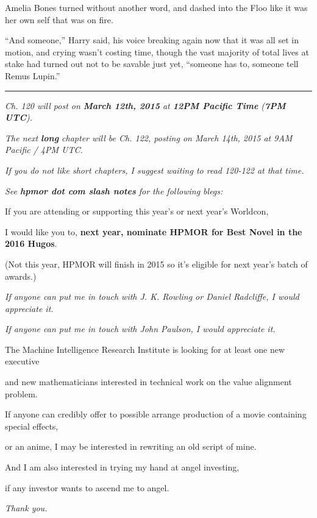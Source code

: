 Amelia Bones turned without another word, and dashed into the Floo like it was her own self that was on fire.

``And someone,'' Harry said, his voice breaking again now that it was all set in motion, and crying wasn't costing time, though the vast majority of total lives at stake had turned out not to be savable just yet, ``someone has to, someone tell Remus Lupin.''

\begin{center}\rule{3in}{0.4pt}\end{center}

\emph{Ch. 120 will post on \textbf{March 12th, 2015} at \textbf{12PM Pacific Time} (\textbf{7PM UTC}).}

\emph{The next \textbf{long} chapter will be Ch. 122, posting on March 14th, 2015 at 9AM Pacific / 4PM UTC.}

\emph{If you do not like short chapters, I suggest waiting to read 120-122 at that time.}

\emph{See \textbf{hpmor dot com slash notes} for the following blegs:}

If you are attending or supporting this year's or next year's Worldcon,

I would like you to, \textbf{next year, nominate HPMOR for Best Novel in the 2016 Hugos}.

(Not this year, HPMOR will finish in 2015 so it's eligible for next year's batch of awards.)

\emph{If anyone can put me in touch with J. K. Rowling or Daniel Radcliffe, I would appreciate it.}

\emph{If anyone can put me in touch with John Paulson, I would appreciate it.}

The Machine Intelligence Research Institute is looking for at least one new executive

and new mathematicians interested in technical work on the value alignment problem.

If anyone can credibly offer to possible arrange production of a movie containing special effects,

or an anime, I may be interested in rewriting an old script of mine.

And I am also interested in trying my hand at angel investing,

if any investor wants to ascend me to angel.

\emph{Thank you.}
